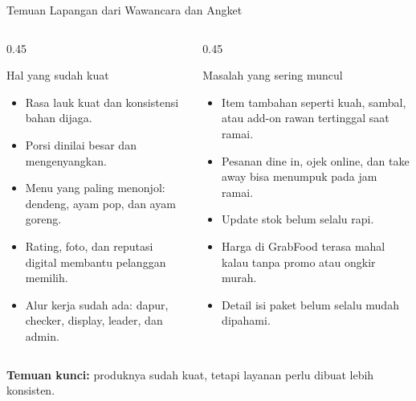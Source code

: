 \documentclass[aspectratio=169,11pt]{beamer}
\newcommand{\strong}[1]{\textbf{\textcolor{usuGreen!85!black}{#1}}}
\begin{document}
\begin{frame}{Temuan Lapangan dari Wawancara dan Angket}
\small
\begin{columns}[T,onlytextwidth]
    \begin{column}{0.45\textwidth}
        \begin{block}{Hal yang sudah kuat}
        \begin{itemize}
            \item Rasa lauk kuat dan konsistensi bahan dijaga.
            \item Porsi dinilai besar dan mengenyangkan.
            \item Menu yang paling menonjol: dendeng, ayam pop, dan ayam goreng.
            \item Rating, foto, dan reputasi digital membantu pelanggan memilih.
            \item Alur kerja sudah ada: dapur, checker, display, leader, dan admin.
        \end{itemize}
        \end{block}
    \end{column}
    \begin{column}{0.45\textwidth}
        \begin{block}{Masalah yang sering muncul}
        \begin{itemize}
            \item Item tambahan seperti kuah, sambal, atau add-on rawan tertinggal saat ramai.
            \item Pesanan dine in, ojek online, dan take away bisa menumpuk pada jam ramai.
            \item Update stok belum selalu rapi.
            \item Harga di GrabFood terasa mahal kalau tanpa promo atau ongkir murah.
            \item Detail isi paket belum selalu mudah dipahami.
        \end{itemize}
        \end{block}
    \end{column}
\end{columns}
\vspace{0.1cm}
\begin{center}
\strong{Temuan kunci:} produknya sudah kuat, tetapi layanan perlu dibuat lebih konsisten.
\end{center}
\end{frame}
\end{document}
